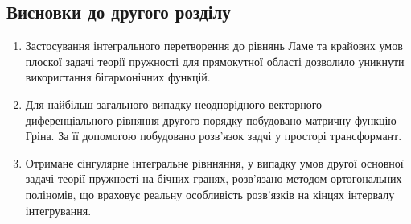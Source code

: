 \subsection{Висновки до другого розділу}
\begin{enumerate}
    \item Застосування інтегрального перетворення до рівнянь Ламе та крайових умов плоскої задачі теорії пружності для прямокутної області
    дозволило уникнути використання бігармонічних функцій.
    \item Для найбільш загального випадку неоднорідного векторного диференціального рівняння другого порядку побудовано матричну функцію Гріна.
    За її допомогою побудовано розв'язок задчі у просторі трансформант.
    \item Отримане сінгулярне інтегральне рівнняння, у випадку умов другої основної задачі теорії пружності на бічних гранях, розв'язано методом ортогональних поліномів,
    що враховує реальну особливість розв'язків на кінцях інтервалу інтегрування.
\end{enumerate}
